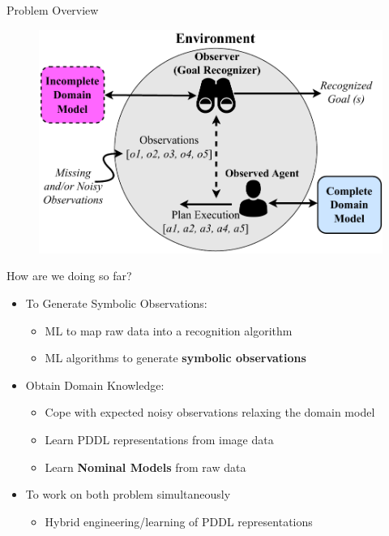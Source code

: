 \documentclass[usenames,dvipsnames]{beamer}
\begin{document}
    \begin{frame}{Problem Overview}
		\begin{figure}[]
		 	\centering
		 	\includegraphics[width=0.9\linewidth]{fig/GoalRecognition-IncompleteDomains-Big.pdf}
		\end{figure}
    \end{frame}

\begin{frame}[c]{How are we doing so far?}
	\begin{itemize}
		\item To Generate Symbolic Observations:
		\begin{itemize}
			\item ML to map raw data into a recognition algorithm {\Large \checkmark}
			\item ML algorithms to generate \textbf{symbolic observations}
		\end{itemize}
		\item Obtain Domain Knowledge:
		\begin{itemize}
			\item Cope with expected noisy observations relaxing the domain model {\Large \color{red} \checkmark}
			\item Learn PDDL representations from image data
			\item Learn \textbf{Nominal Models} from raw data
		\end{itemize}
		\item To work on both problem simultaneously
		\begin{itemize}
			\item Hybrid engineering/learning of PDDL representations 
		\end{itemize}
	\end{itemize}
\end{frame}
\end{document}

